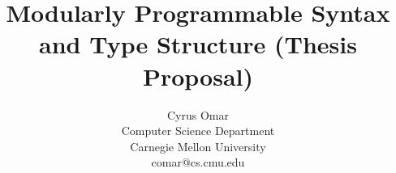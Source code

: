 \documentclass[10pt]{article}
\title{\vspace{-10px}Modularly Programmable   
Syntax \\and Type Structure (Thesis Proposal)}
\author{Cyrus Omar\\
 Computer Science Department\\
 Carnegie Mellon University\\
 comar@cs.cmu.edu}
\date{}                                           %
\theoremstyle{definition}
\begin{document}
\maketitle

\begin{abstract}


\end{abstract}
\end{document}
